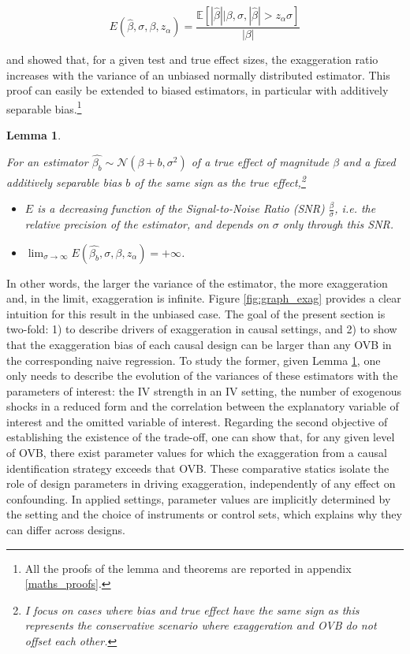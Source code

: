 \documentclass[usletter, 12pt]{article}
\newtheorem{lemma}{Lemma}
\begin{document}
				 \begin{equation}\label{exagg_general}
				 	E(\hat{\beta}, \sigma, \beta, z_{\alpha}) =
					 	\dfrac{\mathbb{E}\left[ | \hat{\beta} | \big| \beta, \sigma, |\hat{\beta}| > z_{\alpha} \sigma \right]}{| \beta |} 
				\end{equation}
				
			\cite{lu_note_2019} and \cite{zwet_significance_2021} showed that, for a given test and true effect sizes, the exaggeration ratio increases with the variance of an unbiased normally distributed estimator. This proof can easily be extended to biased estimators, in particular with additively separable bias.\footnote{All the proofs of the lemma and theorems are reported in appendix \ref{maths_proofs}.}
			
			\begin{lemma}
				\label{lemma_drivers}
			
				For an estimator $\hat{\beta_{b}}  \sim \mathcal{N}(\beta + b, \sigma^{2})$ of a true effect of magnitude $\beta$ and a fixed additively separable bias $b$ of the same sign as the true effect,\footnote{I focus on cases where bias and true effect have the same sign as this represents the conservative scenario where exaggeration and OVB do not offset each other.}
				
				\begin{itemize}
					\item $E$ is a decreasing function of the Signal-to-Noise Ratio (SNR) $\frac{\beta}{\sigma}$, \textit{i.e.} the relative precision of the estimator, and depends on $\sigma$ only through this SNR. 
					\item  $\lim_{\sigma\to \infty} E(\hat{\beta_{b}}, \sigma, \beta, z_{\alpha}) = +\infty$.
				\end{itemize}
			\end{lemma}
			
				In other words, the larger the variance of the estimator, the more exaggeration and, in the limit, exaggeration is infinite. Figure \ref{fig:graph_exag} provides a clear intuition for this result in the unbiased case. The goal of the present section is two-fold: 1) to describe drivers of exaggeration in causal settings, and 2) to show that the exaggeration bias of each causal design can be larger than any OVB in the corresponding naive regression. 				To study the former, given Lemma \ref{lemma_drivers}, one only needs to describe the evolution of the variances of these estimators with the parameters of interest: the IV strength in an IV setting, the number of exogenous shocks in a reduced form and the correlation between the explanatory variable of interest and the omitted variable of interest. 
				Regarding the second objective of establishing the existence of the trade-off, one can show that, for any given level of OVB, there exist parameter values for which the exaggeration from a causal identification strategy exceeds that OVB. These comparative statics isolate the role of design parameters in driving exaggeration, independently of any effect on confounding. In applied settings, parameter values are implicitly determined by the setting and the choice of instruments or control sets, which explains why they can differ across designs.
				 
\end{document}
